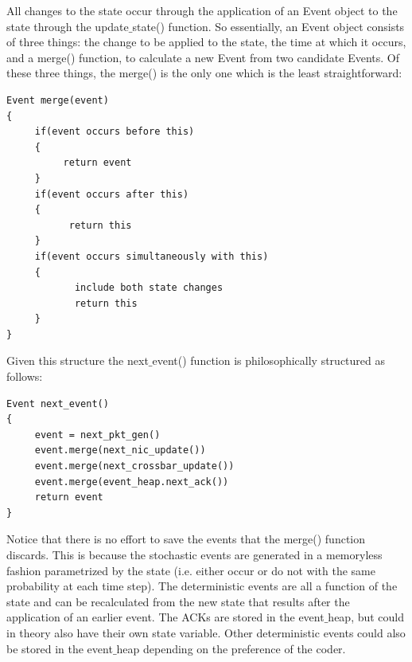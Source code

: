 \documentclass[11pt]{article}%
\begin{document}
All changes to the state occur through the application of an Event object to the state through the update$\_$state() function.  So essentially, an Event object consists of three things: the change to be applied to the state, the time at which it occurs, and a merge() function, to calculate a new Event from two candidate Events.  Of these three things, the merge() is the only one which is the least straightforward:
\begin{verbatim}
Event merge(event)
{
     if(event occurs before this)
     {
          return event
     }
     if(event occurs after this)
     {
           return this
     }
     if(event occurs simultaneously with this)
     {
            include both state changes
            return this
     }
}
\end{verbatim}

Given this structure the next$\_$event() function is philosophically structured as follows:

\begin{verbatim}
Event next_event()
{
     event = next_pkt_gen()
     event.merge(next_nic_update())
     event.merge(next_crossbar_update())
     event.merge(event_heap.next_ack())
     return event
}
\end{verbatim}

Notice that there is no effort to save the events that the merge() function discards.  This is because the stochastic events are generated in a memoryless fashion parametrized by the state (i.e. either occur or do not with the same probability at each time step).  The deterministic events are all a function of the state and can be recalculated from the new state that results after the application of an earlier event.  The ACKs are stored in the event$\_$heap, but could in theory also have their own state variable.  Other deterministic events could also be stored in the event$\_$heap depending on the preference of the coder.
\end{document}
